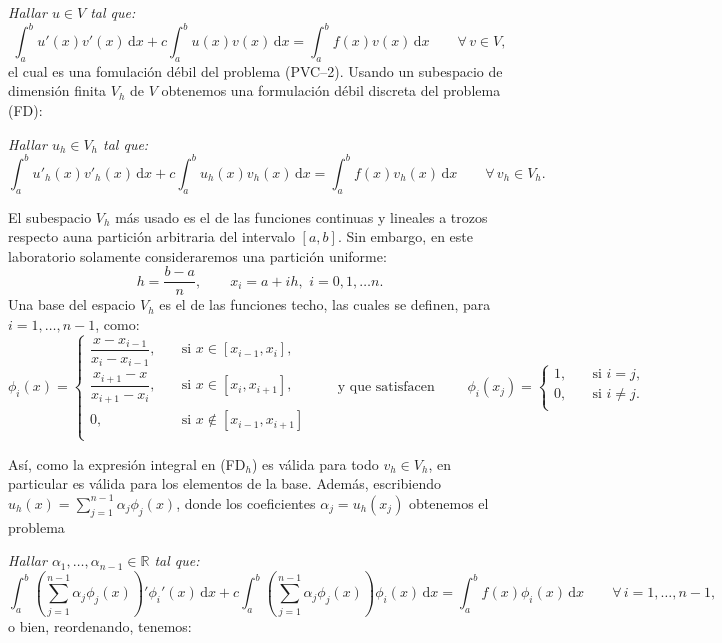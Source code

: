 \documentclass[letterpaper,11pt]{article}
\begin{document}
\emph{Hallar $u\in V$ tal que:}
\begin{equation}\tag{FD}
\int_a^b u'(x)v'(x)\,\mathrm{d}x+c\int_a^b u(x)v(x)\,\mathrm{d}x=\int_a^b f(x)v(x)\,\mathrm{d}x \qquad \forall\,v\in V,
\end{equation}
%
el cual es una fomulaci\'on d\'ebil del problema (PVC--2). Usando un subespacio de dimensi\'on finita $V_h$ de $V$ obtenemos una formulaci\'on d\'ebil discreta del problema (FD): \medskip

\emph{Hallar $u_h\in V_h$ tal que:}
\begin{equation}\tag{FD$_h$}
\int_a^b u'_h(x)v'_h(x)\,\mathrm{d}x+c\int_a^b u_h(x)v_h(x)\,\mathrm{d}x=\int_a^b f(x)v_h(x)\,\mathrm{d}x \qquad \forall\,v_h\in V_h.
\end{equation}

El subespacio $V_h$ m\'as usado es el de las funciones continuas y lineales a trozos respecto auna partici\'on arbitraria del intervalo $[a,b]$. Sin embargo, en este laboratorio solamente consideraremos una partici\'on uniforme:
$$
h=\frac{b-a}{n}, \qquad x_i=a+ih,\,\,i=0,1,\ldots n.
$$
Una base del espacio $V_h$ es el de las funciones techo, las cuales se definen, para $i=1,\ldots,n-1$, como:
$$
\phi_i(x)=
\begin{cases}
\dfrac{x-x_{i-1}}{x_i-x_{i-1}},&\quad \text{si } x\in[x_{i-1},x_i],\\
\dfrac{x_{i+1}-x}{x_{i+1}-x_i},&\quad \text{si } x\in[x_i,x_{i+1}],\\
0,&\quad \text{si } x\notin[x_{i-1},x_{i+1}]\\
\end{cases}
\qquad \text{y que satisfacen } \qquad
\phi_i(x_j)=
\left\{
\begin{array}{cl}
1,&\quad \text{si } i=j,\\
0,&\quad \text{si } i\neq j.\\
\end{array}
\right.
$$

As\'i, como la expresi\'on integral en (FD$_h$) es v\'alida para todo $v_h \in V_h$, en particular es v\'alida para los elementos de la base. Adem\'as, escribiendo $u_h(x)=\sum_{j=1}^{n-1}\alpha_j\phi_j(x)$, donde los coeficientes $\alpha_j=u_h(x_j)$ obtenemos el problema \medskip

\emph{Hallar $\alpha_1,\ldots,\alpha_{n-1}\in \mathbb{R}$ tal que:}
\begin{equation*}
\int_a^b \left(\sum_{j=1}^{n-1}\alpha_j\phi_j(x)\right)'\phi_i'(x)\,\mathrm{d}x+c\int_a^b \left(\sum_{j=1}^{n-1}\alpha_j\phi_j(x)\right)\phi_i(x)\,\mathrm{d}x=\int_a^b f(x)\phi_i(x)\,\mathrm{d}x \qquad \forall\,i=1,\ldots,n-1,
\end{equation*}
%
o bien, reordenando, tenemos: \medskip
\end{document}
